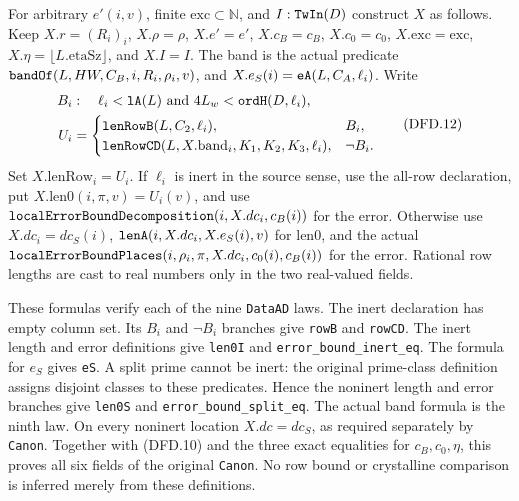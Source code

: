 \documentclass[11pt,a4paper]{article}
\numberwithin{equation}{section}
\theoremstyle{remark}\newtheorem{remark}[theorem]{Remark}
\begin{document}
For arbitrary $e'(i,v)$, finite $\mathrm{exc}\subset\mathbb N$,
and $I:\texttt{Tw\allowbreak In}(D)$ construct $X$ as follows. Keep
$X.r=(R_i)_i$, $X.\rho=\rho$, $X.e'=e'$, $X.c_B=c_B$,
$X.c_0=c_0$, $X.\mathrm{exc}=\mathrm{exc}$,
$X.\eta=\lfloor L.\mathrm{etaSz}\rfloor$, and $X.I=I$.
The band is the actual predicate
$\texttt{band\allowbreak Of}(L,HW,C_B,i,R_i,\rho_i,v)$, and
$X.e_S(i)=\texttt{e\allowbreak A}(L,C_A,\ell_i)$. Write
\[
 \begin{split}
 B_i&:\quad\ell_i<\texttt{l\allowbreak A}(L)
                    \ \text{and}\ 4L_w<\texttt{ord\allowbreak H}(D,\ell_i),\\
 U_i&=\begin{cases}
 \texttt{len\allowbreak Row\allowbreak B}(L,C_2,\ell_i),&B_i,\\
 \texttt{len\allowbreak Row\allowbreak CD}(L,X.\mathrm{band}_i,K_1,K_2,K_3,\ell_i),&\neg B_i.
 \end{cases}
 \end{split}                                           \tag{DFD.12}
\]
Set $X.\mathrm{lenRow}_i=U_i$. If $\ell_i$ is inert in the
source sense, use the all-row declaration, put
$X.\mathrm{len0}(i,\pi,v)=U_i(v)$, and use
$\texttt{local\allowbreak Error\allowbreak Bound\allowbreak Decomposition}(i,X.dc_i,c_B(i))$
for the error. Otherwise use $X.dc_i=dc_S(i)$,
$\texttt{len\allowbreak A}(i,X.dc_i,X.e_S(i),v)$ for $\mathrm{len0}$,
and the actual
$\texttt{local\allowbreak Error\allowbreak Bound\allowbreak Places}(i,\rho_i,\pi,X.dc_i,c_0(i),c_B(i))$
for the error. Rational row lengths are cast to real numbers
only in the two real-valued fields.

These formulas verify each of the nine \texttt{Data\allowbreak AD} laws.
The inert declaration has empty column set. Its $B_i$ and
$\neg B_i$ branches give \texttt{row\allowbreak B} and \texttt{row\allowbreak CD}.
The inert length and error definitions give \texttt{len0I}
and \texttt{error\_\allowbreak bound\_\allowbreak inert\_\allowbreak eq}. The formula for $e_S$
gives \texttt{e\allowbreak S}. A split prime cannot be inert: the
original prime-class definition assigns disjoint classes to
these predicates. Hence the noninert length and error branches
give \texttt{len0S} and \texttt{error\_\allowbreak bound\_\allowbreak split\_\allowbreak eq}.
The actual band formula is the ninth law. On every noninert
location $X.dc=dc_S$, as required separately by
\texttt{Canon}. Together with (DFD.10) and the three exact
equalities for $c_B,c_0,\eta$, this proves all six fields of
the original \texttt{Canon}. No row bound or crystalline
comparison is inferred merely from these definitions.
\end{document}
